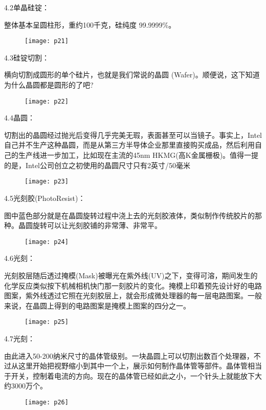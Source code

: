 \documentclass[utf8]{book}
\begin{document}
	4.2单晶硅锭：
	
	整体基本呈圆柱形，重约100千克，硅纯度 99.9999\%。
	
	\begin{figure}[H]
		\centering
		\texttt{[image: p21]}
	\end{figure}
	
	4.3硅锭切割：
	
	横向切割成圆形的单个硅片，也就是我们常说的晶圆 (Wafer)。顺便说，这下知道为什么晶圆都是圆形的了吧?
	
	\begin{figure}[H]
		\centering
		\texttt{[image: p22]}
	\end{figure}
	
	4.4晶圆：
	
	切割出的晶圆经过抛光后变得几乎完美无瑕，表面甚至可以当镜子。事实上，Intel自己并不生产这种晶圆，而是从第三方半导体企业那里直接购买成品，然后利用自己的生产线进一步加工，比如现在主流的45nm HKMG(高K金属栅极)。值得一提的是，Intel公司创立之初使用的晶圆尺寸只有2英寸/50毫米
	
	\begin{figure}[H]
		\centering
		\texttt{[image: p23]}
	\end{figure}
	4.5光刻胶(PhotoResist)：
	
	图中蓝色部分就是在晶圆旋转过程中浇上去的光刻胶液体，类似制作传统胶片的那种。晶圆旋转可以让光刻胶铺的非常薄、非常平。
	
	\begin{figure}[H]
		\centering
		\texttt{[image: p24]}
	\end{figure}

	
	4.6光刻：
	
	光刻胶层随后透过掩模(Mask)被曝光在紫外线(UV)之下，变得可溶，期间发生的化学反应类似按下机械相机快门那一刻胶片的变化。掩模上印着预先设计好的电路图案，紫外线透过它照在光刻胶层上，就会形成微处理器的每一层电路图案。一般来说，在晶圆上得到的电路图案是掩模上图案的四分之一。
	
	\begin{figure}[H]
		\centering
		\texttt{[image: p25]}
	\end{figure}
	4.7光刻：
	
	由此进入50-200纳米尺寸的晶体管级别。一块晶圆上可以切割出数百个处理器，不过从这里开始把视野缩小到其中一个上，展示如何制作晶体管等部件。晶体管相当于开关，控制着电流的方向。现在的晶体管已经如此之小，一个针头上就能放下大约3000万个。
		\begin{figure}[H]
		\centering
		\texttt{[image: p26]}
	\end{figure}
	
\end{document}
